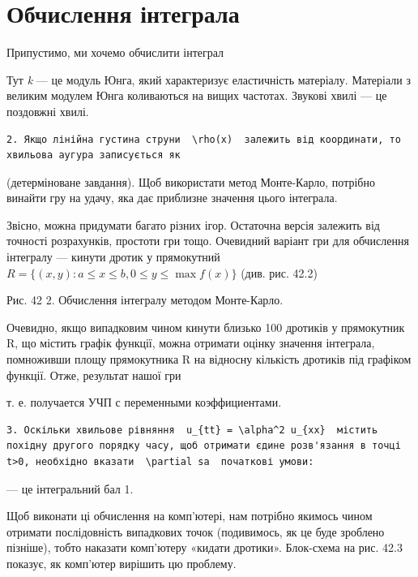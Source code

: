 \documentclass[
  ukrainian,
]{article}
\author{}
\date{}
\begin{document}
\section{Обчислення
інтеграла}\label{ux43eux431ux447ux438ux441ux43bux435ux43dux43dux44f-ux456ux43dux442ux435ux433ux440ux430ux43bux430}

Припустимо, ми хочемо обчислити інтеграл

Тут \emph{k} --- це модуль Юнга, який характеризує еластичність
матеріалу. Матеріали з великим модулем Юнга коливаються на вищих
частотах. Звукові хвилі --- це поздовжні хвилі.

\begin{verbatim}
2. Якщо лінійна густина струни  \rho(x)  залежить від координати, то хвильова аугура записується як
\end{verbatim}

(детерміноване завдання). Щоб використати метод Монте-Карло, потрібно
винайти гру на удачу, яка дає приблизне значення цього інтеграла.

Звісно, можна придумати багато різних ігор. Остаточна версія залежить
від точності розрахунків, простоти гри тощо. Очевидний варіант гри для
обчислення інтегралу --- кинути дротик у прямокутний
\(R = \{(x,y): a \le x \le b, 0 \le y \le \max f(x)\}\) (див. рис. 42.2)

Рис. 42 2. Обчислення інтегралу методом Монте-Карло.

Очевидно, якщо випадковим чином кинути близько 100 дротиків у
прямокутник R, що містить графік функції, можна отримати оцінку значення
інтеграла, помноживши площу прямокутника R на відносну кількість
дротиків під графіком функції. Отже, результат нашої гри

т. е. получается УЧП с переменными коэффициентами.

\begin{verbatim}
3. Оскільки хвильове рівняння  u_{tt} = \alpha^2 u_{xx}  містить похідну другого порядку часу, щоб отримати єдине розв'язання в точці t>0, необхідно вказати  \partial sa  початкові умови:
\end{verbatim}

--- це інтегральний бал 1.

Щоб виконати ці обчислення на комп'ютері, нам потрібно якимось чином
отримати послідовність випадкових точок (подивимось, як це буде зроблено
пізніше), тобто наказати комп'ютеру «кидати дротики». Блок-схема на рис.
42.3 показує, як комп'ютер вирішить цю проблему.
\end{document}
